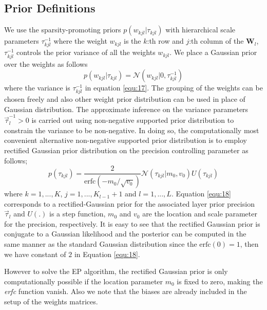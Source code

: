 \documentclass[]{article}
\begin{document}
\subsection{Prior Definitions}
We use the sparsity-promoting priors $p(w_{kjl}|\tau_{kjl})$ with hierarchical scale parameters $\tau^{-1}_{kjl}$ where the weight $w_{kjl}$ is the $k$:th row and $j$:th column of the $\mathbf{W}_l$, $\tau^{-1}_{kjl}$ controls the prior variance of all the weights $w_{kjl}$. We place a Gaussian prior over the weights as follows 
\begin{equation}
	p(w_{kjl}|\tau_{kjl}) = \mathcal{N}(w_{kjl}|0,\tau^{-1}_{kjl})
	\label{equ:17}
\end{equation}
where the variance is $\tau^{-1}_{kjl}$ in equation \ref{equ:17}. The grouping of the weights can be chosen freely and also other weight prior distribution can be used in place of Gaussian distribution. The approximate inference on the variance parameters $\vec{\tau}^{-1}_{l} > 0$ is carried out using non-negative supported prior distribution to constrain the variance to be non-negative. In doing so, the computationally most convenient alternative non-negative supported prior distribution is to employ rectified Gaussian prior distribution on the precision controlling parameter as follows;
\begin{equation}
	p(\tau_{kjl}) = \frac{2}{\text{erfc}(-m_0/\sqrt{v_0})}\mathcal{N}(\tau_{kjl} | m_0,v_0)U(\tau_{kjl})
	\label{equ:18}
\end{equation}
where $k = 1,...,K$, $j = 1,..., K_{l-1}+1$ and $l = 1,...,L$. Equation \ref{equ:18} corresponds to a rectified-Gaussian prior for the associated layer prior precision $\vec{\tau}_{l}$ and $U(.)$ is a step function, $m_0$ and $v_0$ are the location and scale parameter for the precision, respectively. It is easy to see that the rectified Gaussian prior is conjugate to a Gaussian likelihood and the posterior can be computed in the same manner as the standard Gaussian distribution since the $\text{erfc}(0) = 1$, then we have constant of $2$ in Equation \ref{equ:18}. \par However to solve the EP algorithm, the rectified Gaussian prior is only computationally possible if the location parameter $m_0$ is fixed to zero, making the \textit{erfc} function vanish. Also we note that the biases are already included in the setup of the weights matrices.
\end{document}
